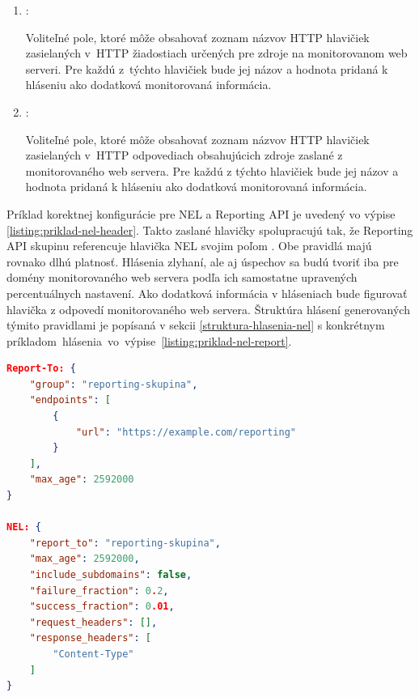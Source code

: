 \begin{enumerate}
    \item {}:

    Voliteľné pole, ktoré môže obsahovať zoznam názvov HTTP hlavičiek zasielaných \mbox{v HTTP} žiadostiach určených pre zdroje na monitorovanom web serveri.
    Pre každú \mbox{z týchto} hlavičiek bude jej názov a hodnota pridaná k hláseniu ako dodatková monitorovaná informácia.
    
    \item {}:

    Voliteľné pole, ktoré môže obsahovať zoznam názvov HTTP hlavičiek zasielaných \mbox{v HTTP} odpovediach obsahujúcich zdroje zaslané z monitorovaného web servera. 
    Pre každú z týchto hlavičiek bude jej názov a hodnota pridaná k hláseniu ako dodatková monitorovaná informácia.
\end{enumerate}

Príklad korektnej konfigurácie pre NEL a Reporting API je uvedený vo výpise \ref{listing:priklad-nel-header}. 
Takto zaslané hlavičky spolupracujú tak, že Reporting API skupinu  referencuje hlavička NEL svojim poľom . Obe pravidlá majú rovnako dlhú platnosť. Hlásenia zlyhaní, ale aj úspechov sa budú tvoriť iba pre domény monitorovaného web servera podľa ich samostatne upravených percentuálnych nastavení. Ako dodatková informácia v hláseniach bude figurovať hlavička  z odpovedí monitorovaného web servera. Štruktúra hlásení generovaných týmito pravidlami je popísaná v sekcii \ref{struktura-hlasenia-nel} s konkrétnym \mbox{príkladom hlásenia vo výpise \ref{listing:priklad-nel-report}.}

\pagebreak

\begin{center}
\centering
\begin{lstlisting}[caption={
Príklad definície hlavičiek NEL a Reporting API.},
label=listing:priklad-nel-header, 
language=json, 
frame=tb,
xleftmargin=.1\textwidth, 
xrightmargin=.1\textwidth]
Report-To: {
    "group": "reporting-skupina",
    "endpoints": [
        {
            "url": "https://example.com/reporting"
        }
    ],
    "max_age": 2592000
}

NEL: {
    "report_to": "reporting-skupina",
    "max_age": 2592000,
    "include_subdomains": false,
    "failure_fraction": 0.2,
    "success_fraction": 0.01,
    "request_headers": [],
    "response_headers": [
        "Content-Type"
    ]
}
\end{lstlisting}
\end{center}


